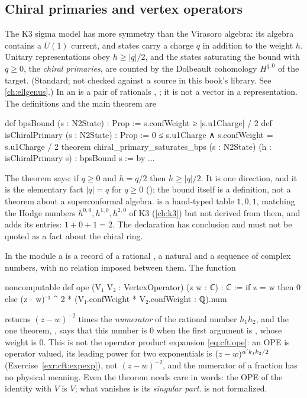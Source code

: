 \subsection{Chiral primaries and vertex operators}

The K3 sigma model has more symmetry than the Virasoro algebra: its algebra contains a $U(1)$
current, and states carry a charge $q$ in addition to the weight $h$. Unitary representations obey
$h\ge|q|/2$, and the states saturating the bound with $q\ge0$, the \emph{chiral
primaries}, are counted by the Dolbeault cohomology $H^{q,0}$ of the target.
(Standard; not checked against a source in this book's library. See \cref{ch:ellgenus}.) In  an  is a pair of rationals
, ; it is not a vector in a representation. The definitions and
the main theorem are
\begin{leancode}
def bpsBound (s : N2State) : Prop :=
  s.confWeight ≥ |s.u1Charge| / 2
def isChiralPrimary (s : N2State) : Prop :=
  0 ≤ s.u1Charge ∧ s.confWeight = s.u1Charge / 2
theorem chiral_primary_saturates_bps (s : N2State) (h : isChiralPrimary s) :
    bpsBound s := by ...
\end{leancode}
The theorem says: if $q\ge0$ and $h=q/2$ then $h\ge|q|/2$. It is one direction, and it is the
elementary fact $|q|=q$ for $q\ge0$ (); the bound itself is a definition,
not a theorem about a superconformal algebra.  is a hand-typed table
$1,0,1$, matching the Hodge numbers $h^{0,0},h^{1,0},h^{2,0}$ of K3 (\cref{ch:k3}) but not derived
from them, and  adds its entries: $1+0+1=2$. The declaration
 has conclusion  and must not be quoted as
a fact about the chiral ring.

In the module  a  is a record of a rational
, a natural  and a sequence  of complex numbers,
with no relation imposed between them. The function
\begin{leancode}
noncomputable def ope (V₁ V₂ : VertexOperator) (z w : ℂ) : ℂ :=
  if z = w then 0
  else (z - w)⁻¹ ^ 2 * (V₁.confWeight * V₂.confWeight : ℚ).num
\end{leancode}
returns $(z-w)^{-2}$ times the \emph{numerator} of the rational number $h_1h_2$, and the one
theorem, , says that this number is $0$ when the first argument is
, whose weight is $0$. This  is not the operator product expansion
\eqref{eq:cft:ope}: an OPE is operator valued, its leading power for two exponentials is
$(z-w)^{\alpha' k_1k_2/2}$ (Exercise~\ref{exr:cft:expexp}), not $(z-w)^{-2}$, and the numerator of a
fraction has no physical meaning. Even the theorem needs care in words: the OPE of the identity
with $V$ is $V$; what vanishes is its \emph{singular part}.  is not
formalized.

